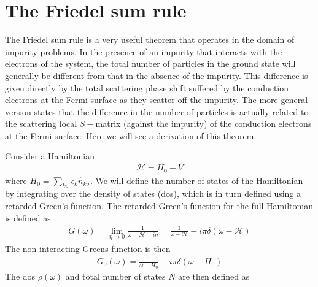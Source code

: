 \section{The Friedel sum rule}
The Friedel sum rule \cite{Friedel,langer,Langreth,hewson} is a very useful theorem that operates in the domain of impurity problems. In the presence of an impurity that interacts with the electrons of the system, the total number of particles in the ground state will generally be different from that in the absence of the impurity. This difference is given directly by the total scattering phase shift suffered by the conduction electrons at the Fermi surface as they scatter off the impurity. The more general version states that the difference in the number of particles is actually related to the scattering local \(S-\)matrix (against the impurity) of the conduction electrons at the Fermi surface. Here we will see a derivation of this theorem.

Consider a Hamiltonian
\begin{equation}\begin{aligned}
	\mathcal{H} = H_0 + V
\end{aligned}\end{equation}
where \(H_0 = \sum_{k\sigma}\epsilon_k \hat n_{k\sigma}\). We will define the number of states of the Hamiltonian by integrating over the density of states (dos), which is in turn defined using a retarded Green's function. The retarded Green's function for the full Hamiltonian is defined as
\begin{equation}\begin{aligned}
	G(\omega) = \lim_{\eta \to 0}\frac{1}{\omega - \mathcal{H} + i\eta} = \frac{1}{\omega - \mathcal{H}} - i\pi\delta\left(\omega - \mathcal{H}\right)
\end{aligned}\end{equation}
The non-interacting Greens function is then
\begin{equation}\begin{aligned}
	G_0(\omega) = \frac{1}{\omega - H_0} - i\pi\delta\left(\omega - H_0\right)
\end{aligned}\end{equation}
The dos \(\rho(\omega)\) and total number of states \(N\) are then defined as

